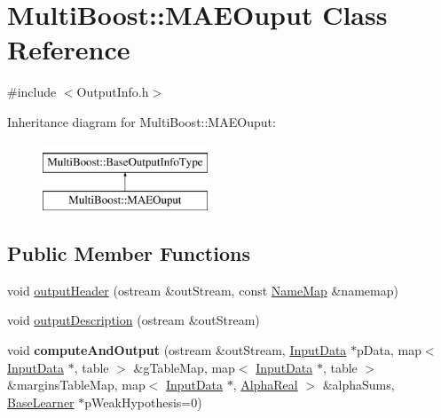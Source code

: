\hypertarget{classMultiBoost_1_1MAEOuput}{\section{Multi\-Boost\-:\-:M\-A\-E\-Ouput Class Reference}
\label{classMultiBoost_1_1MAEOuput}
}


{\ttfamily \#include $<$Output\-Info.\-h$>$}

Inheritance diagram for Multi\-Boost\-:\-:M\-A\-E\-Ouput\-:\begin{figure}[H]
\begin{center}
\leavevmode
\includegraphics[height=2.000000cm]{classMultiBoost_1_1MAEOuput}
\end{center}
\end{figure}
\subsection*{Public Member Functions}
\begin{DoxyCompactItemize}
\item 
void \hyperlink{classMultiBoost_1_1MAEOuput_aea5df1d89f3ea04e20c5b7c2b4604d72}{output\-Header} (ostream \&out\-Stream, const \hyperlink{classMultiBoost_1_1NameMap}{Name\-Map} \&namemap)
\item 
void \hyperlink{classMultiBoost_1_1MAEOuput_a6583e24280a47504100247cc749fc44b}{output\-Description} (ostream \&out\-Stream)
\item 
\hypertarget{classMultiBoost_1_1MAEOuput_ae0af6a24dc60c56c236382b02fb52153}{void {\bfseries compute\-And\-Output} (ostream \&out\-Stream, \hyperlink{classMultiBoost_1_1InputData}{Input\-Data} $\ast$p\-Data, map$<$ \hyperlink{classMultiBoost_1_1InputData}{Input\-Data} $\ast$, table $>$ \&g\-Table\-Map, map$<$ \hyperlink{classMultiBoost_1_1InputData}{Input\-Data} $\ast$, table $>$ \&margins\-Table\-Map, map$<$ \hyperlink{classMultiBoost_1_1InputData}{Input\-Data} $\ast$, \hyperlink{Defaults_8h_a80184c4fd10ab70a1a17c5f97dcd1563}{Alpha\-Real} $>$ \&alpha\-Sums, \hyperlink{classMultiBoost_1_1BaseLearner}{Base\-Learner} $\ast$p\-Weak\-Hypothesis=0)}\label{classMultiBoost_1_1MAEOuput_ae0af6a24dc60c56c236382b02fb52153}

\end{DoxyCompactItemize}
